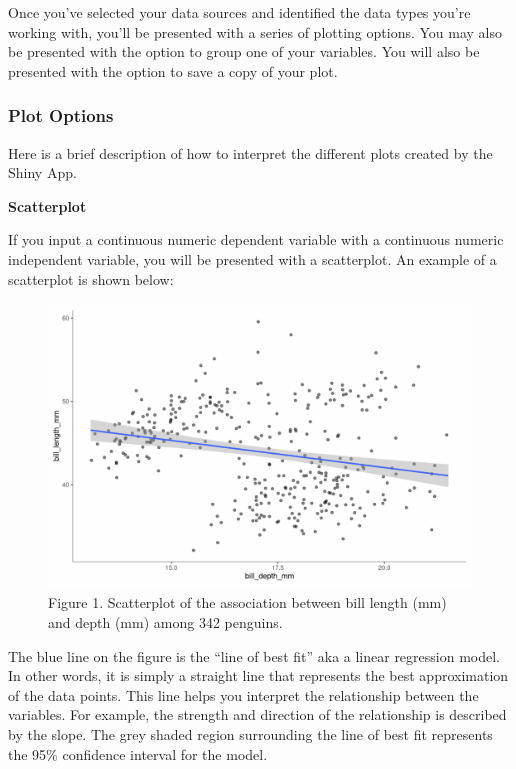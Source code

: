 \documentclass[
]{book}
\begin{document}
Once you've selected your data sources and identified the data types you're working with, you'll be presented with a series of plotting options. You may also be presented with the option to group one of your variables. You will also be presented with the option to save a copy of your plot.

\hypertarget{plot-options}{%
\subsubsection*{Plot Options}\label{plot-options}}

Here is a brief description of how to interpret the different plots created by the Shiny App.

\textbf{Scatterplot}

If you input a continuous numeric dependent variable with a continuous numeric independent variable, you will be presented with a scatterplot. An example of a scatterplot is shown below:

\begin{figure}
\centering
\includegraphics{figures_images/scatterplot_ex.png}
\caption{Figure 1. Scatterplot of the association between bill length (mm) and depth (mm) among 342 penguins.}
\end{figure}

The blue line on the figure is the ``line of best fit'' aka a linear regression model. In other words, it is simply a straight line that represents the best approximation of the data points. This line helps you interpret the relationship between the variables. For example, the strength and direction of the relationship is described by the slope. The grey shaded region surrounding the line of best fit represents the 95\% confidence interval for the model.
\end{document}
